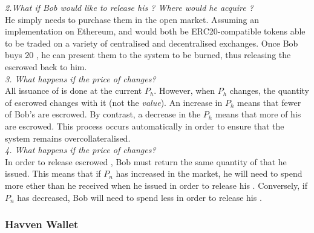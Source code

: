 \noindent \emph{2.What if Bob would like to release his \HAV{}? Where would he acquire \NOM{}?} \\ 

\noindent He simply needs to purchase them in the open market. Assuming an implementation on Ethereum, \HAV{} and \NOM{} would both be ERC20-compatible tokens able to be traded on a variety of centralised and decentralised exchanges. Once Bob buys $20$ \NOM{}, he can present them to the system to be burned, thus releasing the escrowed \HAV{} back to him. \\ 

\noindent \emph{3. What happens if the price of \HAV{} changes?} \\

\noindent All issuance of \NOM{} is done at the current $P_h$. However, when $P_h$ changes, the quantity of escrowed \HAV{} changes with it (not the \emph{value}). An increase in $P_h$ means that fewer of Bob's \HAV{} are escrowed. By contrast, a decrease in the $P_h$ means that more of his \HAV{} are escrowed. This process occurs automatically in order to ensure that the system remains overcollateralised. \\ 

\noindent \emph{4. What happens if the price of \NOM{} changes?} \\ 

\noindent In order to release escrowed \HAV{}, Bob must return the same quantity of \NOM{} that he issued. This means that if $P_n$ has increased in the market, he will need to spend more ether than he received when he issued in order to release his \HAV{}. Conversely, if $P_n$ has decreased, Bob will need to spend less in order to release his \HAV{}.

\subsubsection{Havven Wallet}


\newpage
